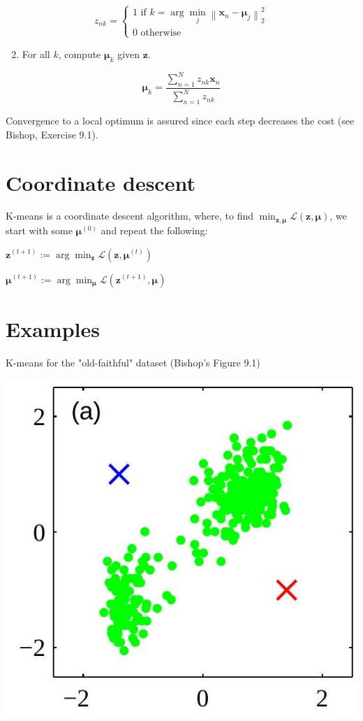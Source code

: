 \documentclass[10pt]{article}
\begin{document}
$$
z_{n k}=\left\{\begin{array}{l}
1 \text { if } k=\arg \min _{j}\left\|\mathbf{x}_{n}-\boldsymbol{\mu}_{j}\right\|_{2}^{2} \\
0 \text { otherwise }
\end{array}\right.
$$

\begin{enumerate}
  \setcounter{enumi}{1}
  \item For all $k$, compute $\boldsymbol{\mu}_{k}$ given $\mathbf{z}$.
\end{enumerate}

$$
\boldsymbol{\mu}_{k}=\frac{\sum_{n=1}^{N} z_{n k} \mathbf{x}_{n}}{\sum_{n=1}^{N} z_{n k}}
$$

Convergence to a local optimum is assured since each step decreases the cost (see Bishop, Exercise 9.1).

\section*{Coordinate descent}
$\mathrm{K}$-means is a coordinate descent algorithm, where, to find $\min _{\boldsymbol{z}, \boldsymbol{\mu}} \mathcal{L}(\mathbf{z}, \boldsymbol{\mu})$, we start with some $\boldsymbol{\mu}^{(0)}$ and repeat the following:

$\mathbf{z}^{(t+1)}:=\arg \min _{\boldsymbol{z}} \mathcal{L}\left(\mathbf{z}, \boldsymbol{\mu}^{(t)}\right)$

$\boldsymbol{\mu}^{(t+1)}:=\arg \min _{\boldsymbol{\mu}} \mathcal{L}\left(\mathbf{z}^{(t+1)}, \boldsymbol{\mu}\right)$

\section*{Examples}
K-means for the "old-faithful" dataset (Bishop's Figure 9.1)

\begin{center}
\includegraphics[max width=\textwidth]{2023_12_30_43b7e6c218cb987b5fcag-6(8)}
\end{center}
\end{document}
